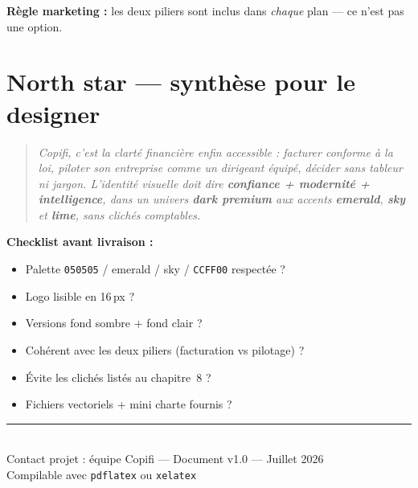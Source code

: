 \documentclass[11pt,a4paper]{report}
\newcommand{\hex}[1]{\texttt{\small #1}}
\begin{document}
\noindent\textbf{Règle marketing :} les deux piliers sont inclus dans \emph{chaque} plan — ce n'est pas une option.

\chapter{North star — synthèse pour le designer}

\begin{quote}
\large\itshape
Copifi, c'est la clarté financière enfin accessible : facturer conforme à la loi,
piloter son entreprise comme un dirigeant équipé, décider sans tableur ni jargon.
L'identité visuelle doit dire \textbf{confiance + modernité + intelligence},
dans un univers \textbf{dark premium} aux accents \textbf{emerald}, \textbf{sky} et \textbf{lime},
sans clichés comptables.
\end{quote}

\vspace{1em}
\noindent\textbf{Checklist avant livraison :}
\begin{itemize}[leftmargin=*]
    \item[\checkmark] Palette \hex{050505} / emerald / sky / \hex{CCFF00} respectée ?
    \item[\checkmark] Logo lisible en 16\,px ?
    \item[\checkmark] Versions fond sombre + fond clair ?
    \item[\checkmark] Cohérent avec les deux piliers (facturation vs pilotage) ?
    \item[\checkmark] Évite les clichés listés au chapitre~8 ?
    \item[\checkmark] Fichiers vectoriels + mini charte fournis ?
\end{itemize}

\vfill
\begin{center}
\rule{0.5\textwidth}{0.4pt}\\[0.5em]
\small
Contact projet : équipe Copifi — Document v1.0 — Juillet 2026\\
Compilable avec \texttt{pdflatex} ou \texttt{xelatex}
\end{center}
\end{document}
